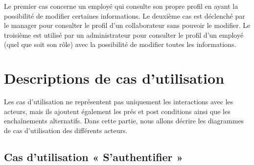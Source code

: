 Le premier cas concerne un employé qui consulte son propre profil en ayant la
possibilité de modifier certaines informations. Le deuxième cas est déclenché
par le manager pour consulter le profil d’un collaborateur sans pouvoir le
modifier. Le troisième est utilisé par un administrateur pour consulter le
profil d’un employé (quel que soit son rôle) avec la possibilité de modifier
toutes les informations. 

\section{Descriptions de cas d'utilisation}
Les cas d’utilisation ne représentent pas uniquement les interactions avec les
acteurs, mais ils ajoutent également les prés et post conditions ainsi que les
enchaînements alternatifs. Dans cette partie, nous allons décrire les diagrammes
de cas d’utilisation des différents acteurs.
    
\subsection*{Cas d'utilisation « S'authentifier »}

